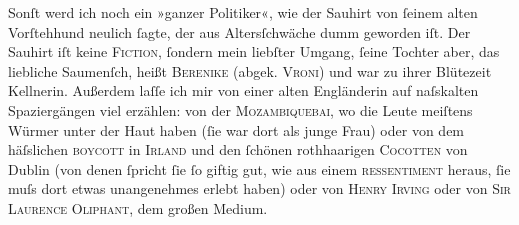 \pstart
           Sonſt werd ich noch ein »ganzer Politiker«, wie der Sauhirt von ſeinem alten Vorſtehhund neulich ſagte, der aus
               Altersſchwäche dumm geworden iſt. Der Sauhirt iſt keine \textsc{Fiction},
               ſondern mein liebſter Umgang, ſeine Tochter aber, das liebliche Saumenſch, heißt \textsc{Berenike} (abgek. \textsc{Vroni}) und war zu ihrer Blütezeit Kellnerin. Außerdem laſſe ich mir von einer alten
                  Engländerin auf naſskalten
               Spaziergängen viel erzählen: von der \textsc{Mozambiquebai}, wo die Leute meiſtens Würmer unter der Haut haben (ſie war dort als
               junge Frau) oder von dem häſslichen \textsc{boycott} in \textsc{Irland} und den ſchönen rothhaarigen \textsc{Cocotten} von Dublin (von denen ſpricht ſie ſo giftig gut, wie
               aus einem \textsc{ressentiment} heraus, ſie muſs dort etwas
               unangenehmes erlebt haben) oder von \textsc{Henry Irving} oder von \textsc{Sir Laurence Oliphant}, dem großen Medium.\pend
           
